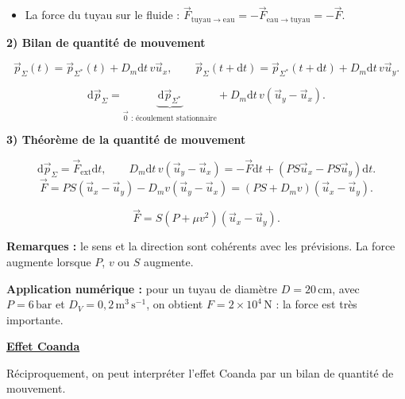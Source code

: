 \documentclass[11pt,a4paper]{article}
\newcommand{\dd}{\mathrm d}
\newcommand{\ux}{\vec u_x}\newcommand{\uy}{\vec u_y}\newcommand{\uz}{\vec u_z}
\newcommand{\titr}[1]{\par\textbf{\underline{#1}}\par\nopagebreak[3]}
\newcommand{\sys}{\Sigma^*}
\newcommand{\etape}[1]{\par\medskip\textbf{#1}\par\nopagebreak[4]}
\begin{document}
\begin{exemple}[breakable]
\begin{minipage}{\linewidth}
\begin{itemize}
\item La force du tuyau sur le fluide : $\vec F_{\mathrm{tuyau}\to\mathrm{eau}}=-\vec F_{\mathrm{eau}\to\mathrm{tuyau}}=-\vec F$.
\end{itemize}
\end{minipage}\par
\etape{2) Bilan de quantité de mouvement}
\[\vec p_\Sigma(t)=\vec p_{\sys}(t)+D_m\dd t\,v\ux,\qquad
\vec p_\Sigma(t+\dd t)=\vec p_{\sys}(t+\dd t)+D_m\dd t\,v\uy.\]
\begin{cadre}\[\dd\vec p_\Sigma=\underbrace{\dd\vec p_{\sys}}_{\vec0\text{ : écoulement stationnaire}}+D_m\dd t\,v(\uy-\ux).\]\end{cadre}
\etape{3) Théorème de la quantité de mouvement}
\[\dd\vec p_\Sigma=\vec F_{\mathrm{ext}}\dd t,\qquad D_m\dd t\,v(\uy-\ux)=-\vec F\dd t+(PS\ux-PS\uy)\dd t.\]
\[\vec F=PS(\ux-\uy)-D_m v(\uy-\ux)=(PS+D_m v)(\ux-\uy).\]
\begin{cadre}\[\vec F=S(P+\mu v^2)(\ux-\uy).\]\end{cadre}
\textbf{Remarques :} le sens et la direction sont cohérents avec les prévisions. La force augmente lorsque $P$, $v$ ou $S$ augmente.
\par\medskip\noindent\textbf{Application numérique :} pour un tuyau de diamètre $D=20\,\mathrm{cm}$, avec $P=6\,\mathrm{bar}$ et $D_V=0{,}2\,\mathrm{m^3\,s^{-1}}$, on obtient $F=2\times10^4\,\mathrm N$ : la force est très importante. \\
\titr{Effet Coanda}
\begin{center}\end{center}
Réciproquement, on peut interpréter l'effet Coanda par un bilan de quantité de mouvement.
\begin{center}\end{center}
\end{exemple}
\Needspace{75mm}
\end{document}
